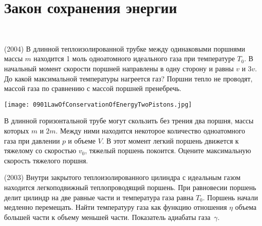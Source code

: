 \section{Закон сохранения энергии}

\begin{ex}
\hspace{0pt} \\
\begin{minipage}{.65\textwidth}
(2004) В длинной теплоизолированной трубке между одинаковыми поршнями массы $m$ находится 1 моль одноатомного идеального газа при температуре $T_0$. 
В начальный момент скорости поршней направлены в одну сторону и равны $v$ и $3v$. До какой максимальной температуры нагреется газ? 
Поршни тепло не проводят, массой газа по сравнению с массой поршней пренебречь.
\end{minipage}
\begin{minipage}{.35\textwidth}
\centering
\texttt{[image: 0901LawOfConservationOfEnergyTwoPistons.jpg]}
\end{minipage}
\begin{ans}

\end{ans}
\end{ex}

\begin{ex}
В длинной горизонтальной трубе могут скользить без трения два поршня, массы которых $m$ и $2m$. 
Между ними находится некоторое количество одноатомного газа при давлении $p$ и объеме $V$. 
В этот момент легкий поршень движется к тяжелому со скоростью $v_0$, тяжелый поршень покоится. 
Оцените максимальную скорость тяжелого поршня.
\begin{ans}

\end{ans}
\end{ex}

\begin{ex}
(2003) Внутри закрытого теплоизолированного цилиндра с идеальным газом находится легкоподвижный теплопроводящий поршень. 
При равновесии поршень делит цилиндр на две равные части и температура газа равна $T_0$. Поршень начали медленно перемещать. 
Найти температуру газа как функцию отношения $\eta$ объема большей части к объему меньшей части. Показатель адиабаты газа~$\gamma$.
\begin{ans}

\end{ans}
\end{ex}

